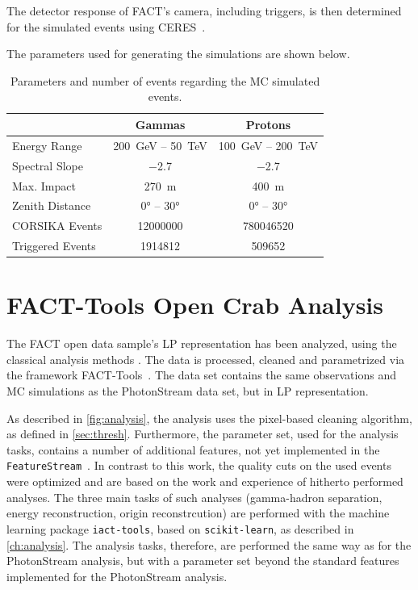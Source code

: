 The detector response of FACT's camera, including
triggers, is then determined for the simulated events using CERES~\cite{ceres}.

The parameters used for generating the simulations are shown below.

\begin{table}
  \centering%
  \begin{tabular}{l
                  c
                  c}
      \toprule
      {}    & Gammas  & Protons      \\
      \midrule
      Energy Range & \SI{200}{\GeV} – \SI{50}{\TeV} & \SI{100}{\GeV} – \SI{200}{\TeV} \\
      Spectral Slope & \num{-2.7} & \num{-2.7} \\
      Max. Impact & \SI{270}{\meter} & \SI{400}{\meter} \\
      Zenith Distance & \ang{0} – \ang{30} & \ang{0} – \ang{30} \\
      CORSIKA Events & \num{12000000} & \num{780046520}\\
      Triggered Events & \num{1914812} & \num{509652}\\
      \bottomrule
  \end{tabular}
  \caption{Parameters and number of events regarding the MC simulated events.}
  \label{tab:mcs}
\end{table}

\section{FACT-Tools Open Crab Analysis}\label{sec:facttools}
%
The FACT open data sample's LP representation has been analyzed, using the
classical analysis methods \cite{openana}. The data is processed, cleaned and parametrized via the framework FACT-Tools~\cite{facttools}. The data set contains the same observations and MC simulations as the PhotonStream data set, but in LP representation.

As described in \autoref{fig:analysis}, the analysis uses the pixel-based
cleaning algorithm, as defined in \autoref{sec:thresh}. Furthermore, the
parameter set, used for the analysis tasks, contains a number of additional
features, not yet implemented in the
\texttt{FeatureStream}~\cite{FeatureStream}. In contrast to this work, the
quality cuts on the used events were optimized and are based on the work and
experience of hitherto performed analyses. The three main tasks of such
analyses (gamma-hadron separation, energy reconstruction, origin
reconstrcution) are performed with the machine learning package \texttt{iact-tools}, based on \texttt{scikit-learn}, as described in \autoref{ch:analysis}.
The analysis tasks, therefore, are performed the same way as for the
PhotonStream analysis, but with a parameter set beyond the standard features implemented for the PhotonStream analysis.

